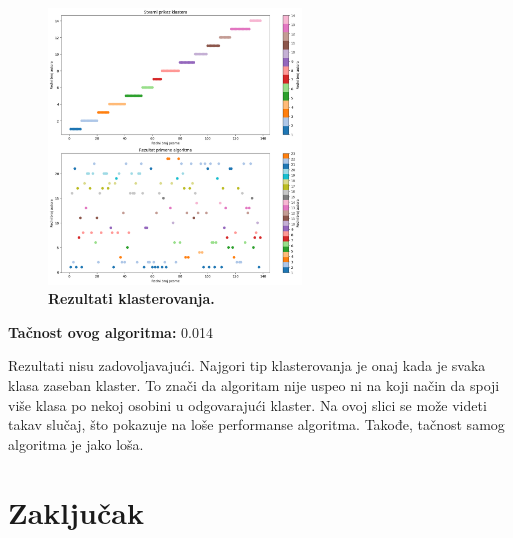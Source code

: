 \documentclass{article}
\begin{document}
\begin{flushleft}
\begin{figure}[ht]
    \centering
    \includegraphics[width=0.6\textwidth]{klasterovanje.png}
    \captionsetup{labelformat=empty}
    \caption{\textbf{Rezultati klasterovanja.}}
    \label{fig:nedostajuce}
\end{figure}

\textbf{Tačnost ovog algoritma:} 0.014 \\
\vspace{3mm}

Rezultati nisu zadovoljavajući. Najgori tip klasterovanja je onaj kada je svaka klasa zaseban klaster. To znači da algoritam nije uspeo ni na koji način da spoji više klasa po nekoj osobini u odgovarajući klaster. Na ovoj slici se može videti takav slučaj, što pokazuje na loše performanse algoritma. Takođe, tačnost samog algoritma je jako loša.
\end{flushleft}




\newpage

\section{Zaključak}
\end{document}
